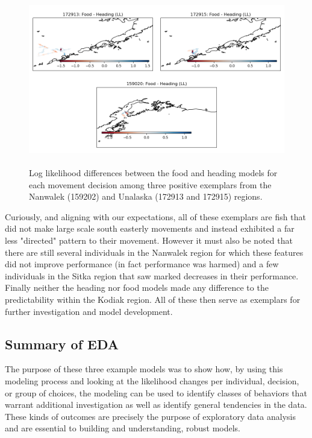 \documentclass[11pt]{article}
\begin{document}
\begin{figure}[h!] 
	\centering
  \includegraphics[height=75mm]{figures/fh_positive.png}
  \caption{Log likelihood differences between the food and heading models for each movement decision among three positive exemplars from the Nanwalek (159202) and Unalaska (172913 and 172915) regions.}
  \label{fig:fh_positive}
\end{figure}

Curiously, and aligning with our expectations, all of these exemplars are fish that did not make large scale south easterly movements and instead exhibited a far less "directed" pattern to their movement. However it must also be noted that there are still several individuals in the Nanwalek region for which these features did not improve performance (in fact performance was harmed) and a few individuals in the Sitka region that saw marked decreases in their performance. Finally neither the heading nor food models made any difference to the predictability within the Kodiak region. All of these then serve as exemplars for further investigation and model development. 

\subsection*{Summary of EDA}

The purpose of these three example models was to show how, by using this modeling process and looking at the likelihood changes per individual, decision, or group of choices, the modeling can be used to identify classes of behaviors that warrant additional investigation as well as identify general tendencies in the data. These kinds of outcomes are precisely the purpose of exploratory data analysis and are essential to building and understanding, robust models. 
\end{document}
